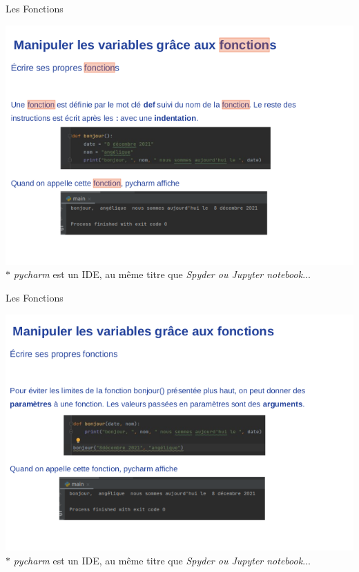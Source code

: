 \documentclass[xcolor=table]{beamer}
\begin{document}
\begin{frame}{Les Fonctions}

\includegraphics[scale=0.5]{images/fonctions_3.png}
\vspace{-0.3cm}
\footnotesize{$*$ \textit{pycharm} est un IDE, au même titre que \textit{Spyder ou Jupyter notebook}...}
    
\end{frame}

\begin{frame}{Les Fonctions}

\includegraphics[scale=0.5]{images/fonction_3.png}
\vspace{-0.3cm}
\footnotesize{$*$ \textit{pycharm} est un IDE, au même titre que \textit{Spyder ou Jupyter notebook}...}
    
\end{frame}
\end{document}

